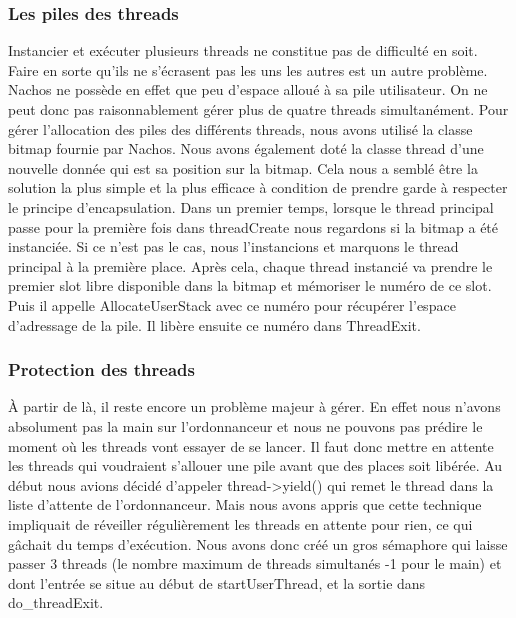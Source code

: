 \documentclass[10pt]{article}
\begin{document}
\subsubsection{Les piles des threads}

Instancier et exécuter plusieurs threads ne constitue pas de difficulté en soit.
Faire en sorte qu'ils ne s'écrasent pas les uns les autres est un autre problème.
Nachos ne possède en effet que peu d'espace alloué à sa pile utilisateur.
On ne peut donc pas raisonnablement gérer plus de quatre threads simultanément.
Pour gérer l'allocation des piles des différents threads, nous avons utilisé la classe
bitmap fournie par Nachos. Nous avons également doté la classe thread d'une nouvelle donnée
qui est sa position sur la bitmap. Cela nous a semblé être la solution la plus simple et
la plus efficace à condition de prendre garde à respecter le principe d'encapsulation.
Dans un premier temps, lorsque le thread principal passe pour la première fois dans threadCreate
nous regardons si la bitmap a été instanciée. Si ce n'est pas le cas, nous l'instancions
et marquons le thread principal à la première place.
Après cela, chaque thread instancié va prendre le premier slot libre disponible dans
la bitmap et mémoriser le numéro de ce slot. Puis il appelle AllocateUserStack avec ce
numéro pour récupérer l'espace d'adressage de la pile.
Il libère ensuite ce numéro dans ThreadExit.

\subsubsection{Protection des threads}

À partir de là, il reste encore un problème majeur à gérer. En effet nous n'avons absolument
pas la main sur l'ordonnanceur et nous ne pouvons pas prédire le moment où les threads
vont essayer de se lancer. Il faut donc mettre en attente les threads qui voudraient
s'allouer une pile avant que des places soit libérée. Au début nous avions décidé
d'appeler thread->yield() qui remet le thread dans la liste d'attente de l'ordonnanceur.
Mais nous avons appris que cette technique impliquait de réveiller régulièrement les
threads en attente pour rien, ce qui gâchait du temps d'exécution.
Nous avons donc créé un gros sémaphore qui laisse passer 3 threads (le nombre maximum de threads
simultanés -1 pour le main) et dont l'entrée se situe au début de startUserThread, et la sortie dans do\_threadExit.
\end{document}
